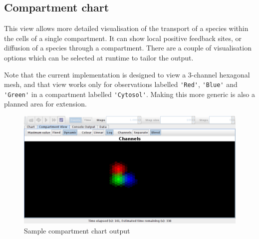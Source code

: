 \subsection{Compartment chart}

This view allows more detailed visualisation of the transport of a species within the cells of a single compartment. It can show local positive feedback sites, or diffusion of a species through a compartment. There are a couple of visualisation options which can be selected at runtime to tailor the output.

Note that the current implementation is designed to view a 3-channel hexagonal mesh, and that view works only for observations labelled \verb|'Red'|, \verb|'Blue'| and \verb|'Green'| in a compartment labelled \verb|'Cytosol'|. Making this more generic is also a planned area for extension.

\begin{figure}[h!]
 \centering
 \includegraphics[scale=0.3]{./images/CompartmentView.png}
 \caption{Sample compartment chart output}
 \label{fig:compartmentPane}
\end{figure}
